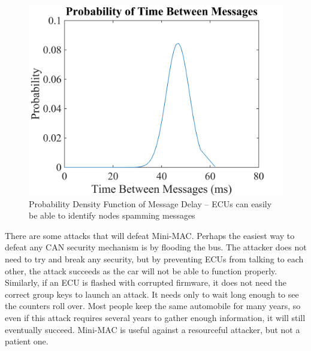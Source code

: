 	\selectfont
	\begin{figure}
		\centering
		\includegraphics[width=\columnwidth]{figures/pdf.png}
		\caption{{\selectfont Probability Density Function of Message Delay -- 
		ECUs can easily be able to identify nodes spamming messages}}
		\label{fig-msgdelay}
	\end{figure}
	
There are some attacks that will defeat Mini-MAC. Perhaps the easiest way to defeat any CAN security mechanism is by flooding the bus. The attacker does not need to try and break any security, but by preventing ECUs from talking to each other, the attack succeeds as the car will not be able to function properly. Similarly, if an ECU is flashed with corrupted firmware, it does not need the correct group keys to launch an attack. It needs only to wait long enough to see the counters roll over. Most people keep the same automobile for many years, so even if this attack requires several years to gather enough information, it will still eventually succeed. Mini-MAC is useful against a resourceful attacker, but not a patient one.
